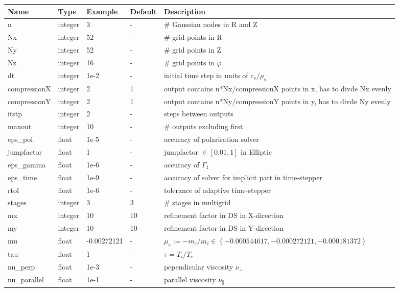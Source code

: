 \begin{longtable}{llll>{\RaggedRight}p{7cm}}
\toprule
\rowcolor{gray!50}\textbf{Name} &  \textbf{Type} & \textbf{Example} & \textbf{Default} & \textbf{Description}  \\ \midrule
n      & integer & 3 & - &\# Gaussian nodes in R and Z \\
Nx     & integer &52& - &\# grid points in R \\
Ny     & integer &52& - &\# grid points in Z \\
Nz     & integer &16& - &\# grid points in $\varphi$ \\
dt     & integer &1e-2& - &initial time step in units of $c_s/\rho_s$ \\
compressionX & integer & 2 & 1 & output contains n*Nx/compressionX points in x,
    has to divde Nx evenly\\
compressionY & integer & 2 & 1 & output contains n*Ny/compressionY points in y,
    has to divde Ny evenly\\
itstp  & integer & 2  & - & steps between outputs \\
maxout & integer & 10 & - & \# outputs excluding first \\
eps\_pol   & float &1e-5    & - &  accuracy of polarisation solver \\
jumpfactor & float &1& - &     jumpfactor $\in \left[0.01,1\right]$ in Elliptic\\
eps\_gamma & float &1e-6    & - & accuracy of $\Gamma_1$  \\
eps\_time  & float &1e-9   & - & accuracy of solver for implicit part in time-stepper \\
rtol  & float &1e-6   & - &tolerance of adaptive time-stepper \\
stages      & integer & 3 & 3 & \# stages in multigrid  \\
mx     & integer & 10 & 10 & refinement factor in DS in X-direction\\
my     & integer & 10 & 10 & refinement factor in DS in Y-direction\\
mu         & float & -0.00272121& - & $\mu_e :=-m_e/m_i \in \left\{ -0.000544617, -0.000272121, -0.000181372 \right\}$\\
tau        & float &1      & - & $\tau = T_i/T_e$  \\
nu\_perp   & float &1e-3   & - & pependicular viscosity $\nu_\perp$ \\
nu\_parallel & float &1e-1 & - & parallel viscosity $\nu_\parallel$ \\

\end{longtable}
